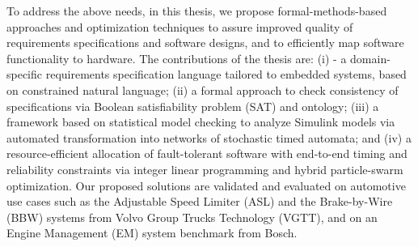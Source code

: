 {	To address the above needs, in this thesis, we propose formal-methods-based approaches and optimization techniques to assure improved quality of requirements specifications and software designs, and to efficiently map software functionality to hardware. The contributions of the thesis are: (i) \resa{} - a domain-specific requirements specification language tailored to embedded systems, based on constrained natural language; (ii) a formal approach to check consistency of \resa{} specifications via Boolean satisfiability problem (SAT) and ontology; (iii) a framework based on statistical model checking to analyze Simulink models via automated transformation into networks of stochastic timed automata; and (iv) a resource-efficient allocation of fault-tolerant software with end-to-end timing and reliability constraints via integer linear programming and hybrid particle-swarm optimization. Our proposed solutions are validated and evaluated on automotive use cases such as the Adjustable Speed Limiter (ASL) and the Brake-by-Wire (BBW) systems from Volvo Group Trucks Technology (VGTT), and on an Engine Management (EM) system benchmark from Bosch.
} %


